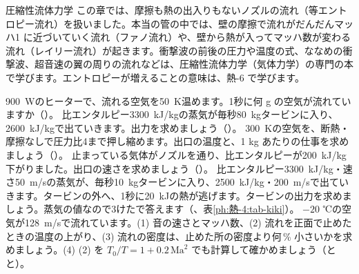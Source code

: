 \begin{phsaki}{圧縮性流体力学}
この章では、摩擦も熱の出入りもないノズルの流れ（等エントロピー流れ）を扱いました。本当の管の中では、壁の摩擦で流れがだんだんマッハ1 に近づいていく流れ（ファノ流れ）や、壁から熱が入ってマッハ数が変わる流れ（レイリー流れ）が起きます。衝撃波の前後の圧力や温度の式、ななめの衝撃波、超音速の翼の周りの流れなどは、圧縮性流体力学（気体力学）の専門の本で学びます。エントロピーが増えることの意味は、熱-6 で学びます。
\end{phsaki}

\bkendproblems
{}%
\bkproblem \qty{900}{W}のヒーターで、流れる空気を\qty{50}{K}温めます。1秒に何 g の空気が流れていますか（）。
\bkproblem 比エンタルピー\qty{3300}{kJ/kg}の蒸気が毎秒\qty{80}{kg}タービンに入り、\qty{2600}{kJ/kg}で出ていきます。出力を求めましょう（）。
\bkproblem \qty{300}{K}の空気を、断熱・摩擦なしで圧力比4まで押し縮めます。出口の温度と、1 kg あたりの仕事を求めましょう（）。
\bkproblem 止まっている気体がノズルを通り、比エンタルピーが\qty{200}{kJ/kg}下がりました。出口の速さを求めましょう（）。
\bkproblem 比エンタルピー\qty{3300}{kJ/kg}・速さ\qty{50}{m/s}の蒸気が、毎秒\qty{10}{kg}タービンに入り、\qty{2500}{kJ/kg}・\qty{200}{m/s}で出ていきます。タービンの外へ、1秒に\qty{20}{kJ}の熱が逃げます。タービンの出力を求めましょう。蒸気の値なので3けたで答えます（、表\ref{ph:熱-4:tab-kiki}）。
\bkproblem $-20$ ℃の空気が\qty{128}{m/s}で流れています。(1) 音の速さとマッハ数、(2) 流れを正面で止めたときの温度の上がり、(3) 流れの密度は、止めた所の密度より何\,\% 小さいかを求めましょう。(4) (2) を $T_0/T=1+0.2\,\mathrm{Ma}^2$ でも計算して確かめましょう（とと）。
